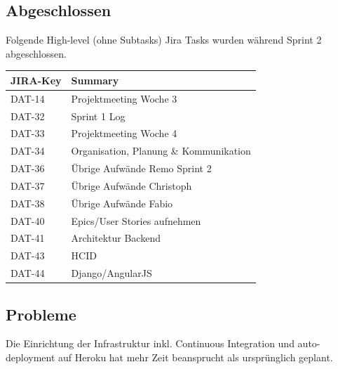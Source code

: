 \subsection*{Abgeschlossen}
Folgende High-level (ohne Subtasks) Jira Tasks wurden während Sprint 2 abgeschlossen.

\begin{table}[H]
\centering
\begin{tabular}{ll}
	\toprule
	\textbf{JIRA-Key} & \textbf{Summary}\\
	\midrule
		DAT-14 & Projektmeeting Woche 3\\
		DAT-32 & Sprint 1 Log\\
		DAT-33 & Projektmeeting Woche 4\\
		DAT-34 & Organisation, Planung \& Kommunikation\\
		DAT-36 & Übrige Aufwände Remo Sprint 2\\
		DAT-37 & Übrige Aufwände Christoph\\
		DAT-38 & Übrige Aufwände Fabio\\
		DAT-40 & Epics/User Stories aufnehmen\\
		DAT-41 & Architektur Backend\\
		DAT-43 & HCID\\
		DAT-44 & Django/AngularJS\\
	\bottomrule
\end{tabular}	
\end{table}

\subsection*{Probleme}
Die Einrichtung der Infrastruktur inkl. Continuous Integration und auto-deployment auf Heroku hat mehr Zeit beansprucht als ursprünglich geplant.